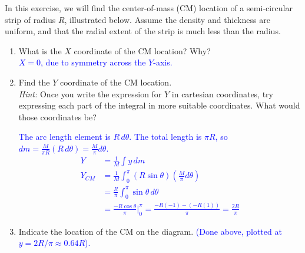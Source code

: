 \documentclass[11pt, letterpaper, openany]{book}
\newenvironment{exercise}[1][Exercise]{%
  \tcolorbox[blanker, breakable, left=1em,
    before skip=1em, after skip=1em,
    borderline west={3pt}{0pt}{PhysNavy},
    colback=PhysCream,
    before upper={\textcolor{PhysNavy}{\sffamily\bfseries #1:}\space}
  ]%
}{%
  \endtcolorbox%
}
\begin{document}
\begin{exercise}[Exercise 3]
In this exercise, we will find the center-of-mass (CM) location of a semi-circular strip of radius $R$, illustrated below. Assume the density and thickness are uniform, and that the radial extent of the strip is much less than the radius.
\begin{enumerate}[label=(\alph*)]
    \item What is the $X$ coordinate of the CM location? Why? \\
    \textcolor{blue}{$X=0$, due to symmetry across the $Y$-axis.}
    
    \item Find the $Y$ coordinate of the CM location. \\
    \textit{Hint:} Once you write the expression for $Y$ in cartesian coordinates, try expressing each part of the integral in more suitable coordinates. What would those coordinates be? \\
    \begin{center}
    \end{center}
    \textcolor{blue}{
    The arc length element is $R\,d\theta$. The total length is $\pi R$, so $dm = \frac{M}{\pi R}(R\,d\theta) = \frac{M}{\pi}d\theta$.
    \begin{align*}
        Y &= \frac{1}{M}\int y\,dm \\
        Y_{CM} &= \frac{1}{M}\int_0^\pi (R\sin\theta)\left(\frac{M}{\pi}d\theta\right) \\
        &= \frac{R}{\pi}\int_0^\pi \sin\theta\,d\theta \\
        &= \frac{-R\cos\theta}{\pi} \Big|_0^\pi = \frac{-R(-1) - (-R(1))}{\pi} = \frac{2R}{\pi}
    \end{align*}
    }
    
    \item Indicate the location of the CM on the diagram. \textcolor{blue}{(Done above, plotted at $y = 2R/\pi \approx 0.64R$).}
\end{enumerate}
\end{exercise}
\end{document}
